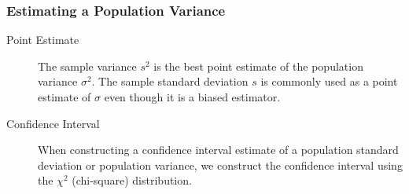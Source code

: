 \documentclass[xcolor=dvipsnames]{beamer}
\begin{document}



\begin{frame}
  \frametitle{Estimating a Population Variance}
  \begin{description}
  \item[Point Estimate] The sample variance $s^{2}$ is the best point
    estimate of the population variance $\sigma^{2}$. The sample
    standard deviation $s$ is commonly used as a point estimate of
    $\sigma$ even though it is a biased estimator.
  \item[Confidence Interval] When constructing a confidence interval
    estimate of a population standard deviation or population
    variance, we construct the confidence interval using the
    \alert{$\chi^{2}$ (chi-square) distribution}.
  \end{description}
\end{frame}
\end{document}
